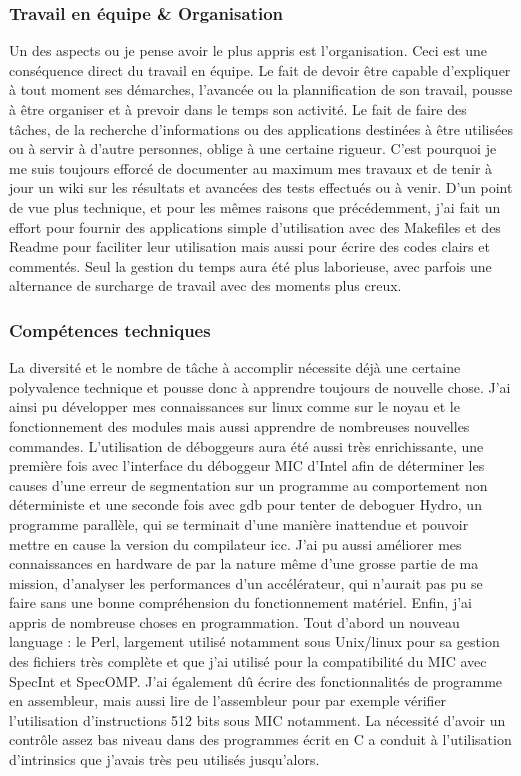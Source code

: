 \documentclass[11pt]{article}
\begin{document}
			\subsubsection{Travail en équipe \& Organisation}
			Un des aspects ou je pense avoir le plus appris est l'organisation. Ceci est une conséquence direct du travail 
			en équipe. Le fait de devoir être capable d'expliquer à tout moment ses démarches, l'avancée ou la plannification 
			de son travail, pousse à être organiser et à prevoir dans le temps son activité. Le fait de faire des tâches, de la 
			recherche d'informations ou des applications destinées à être utilisées ou à servir à d'autre personnes, oblige à une 
			certaine rigueur. C'est pourquoi je me suis toujours efforcé de documenter au maximum mes travaux et de tenir à jour 
			un wiki sur les résultats et avancées des tests effectués ou à venir. \newline
			D'un point de vue plus technique, et pour les mêmes raisons que précédemment, j'ai fait un effort pour fournir 
			des applications simple d'utilisation avec des Makefiles et des Readme pour faciliter leur utilisation mais aussi 
			pour écrire des codes clairs et commentés. \newline
			Seul la gestion du temps aura été plus laborieuse, avec parfois une alternance de surcharge de travail avec des moments 
			plus creux.
			\subsubsection{Compétences techniques}
			La diversité et le nombre de tâche à accomplir nécessite déjà une certaine polyvalence technique et pousse donc à 
			apprendre toujours de nouvelle chose. J'ai ainsi pu développer mes connaissances sur linux comme sur le noyau et 
			le fonctionnement des modules mais aussi apprendre de nombreuses nouvelles commandes. \newline
			L'utilisation de déboggeurs aura été aussi très enrichissante, une première fois avec l'interface du déboggeur 
			MIC d'Intel afin de déterminer les causes d'une erreur de segmentation sur un programme au comportement non 
			déterministe et une seconde fois avec gdb pour tenter de deboguer Hydro, un programme parallèle, qui se terminait 
			d'une manière inattendue et pouvoir mettre en cause la version du compilateur icc. \newline
			J'ai pu aussi améliorer mes connaissances en hardware de par la nature même d'une grosse partie de ma mission, d'analyser 
			les performances d'un accélérateur, qui n'aurait pas pu se faire sans une bonne compréhension du fonctionnement matériel. \newline
			Enfin, j'ai appris de nombreuse choses en programmation. Tout d'abord un nouveau language : le Perl, largement utilisé 
			notamment sous Unix/linux pour sa gestion des fichiers très complète et que j'ai utilisé pour la compatibilité du MIC 
			avec SpecInt et SpecOMP. J'ai également dû écrire des fonctionnalités de programme en assembleur, mais aussi lire 
			de l'assembleur pour par exemple vérifier l'utilisation d'instructions 512 bits sous MIC notamment. La nécessité 
			d'avoir un contrôle assez bas niveau dans des programmes écrit en C a conduit à l'utilisation d'intrinsics que j'avais 
			très peu utilisés jusqu'alors.
\end{document}
